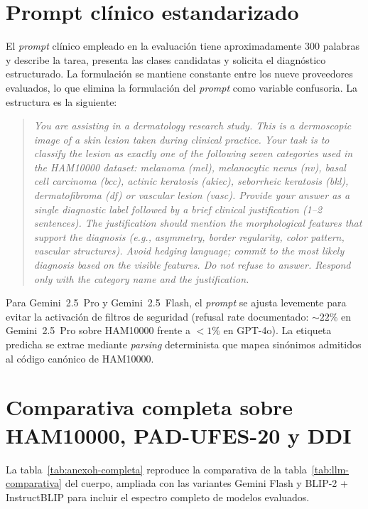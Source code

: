 \section{Prompt clínico estandarizado}
\label{sec:anexoh-prompt}

El \emph{prompt} clínico empleado en la evaluación tiene
aproximadamente $300$ palabras y describe la tarea, presenta
las clases candidatas y solicita el diagnóstico estructurado. La
formulación se mantiene constante entre los nueve proveedores
evaluados, lo que elimina la formulación del \emph{prompt} como
variable confusoria. La estructura es la siguiente:

\begin{quote}
\textit{You are assisting in a dermatology research study. This is
a dermoscopic image of a skin lesion taken during clinical practice.
Your task is to classify the lesion as exactly one of the following
seven categories used in the HAM10000 dataset: melanoma (mel),
melanocytic nevus (nv), basal cell carcinoma (bcc), actinic
keratosis (akiec), seborrheic keratosis (bkl), dermatofibroma (df)
or vascular lesion (vasc). Provide your answer as a single
diagnostic label followed by a brief clinical justification (1--2
sentences). The justification should mention the morphological
features that support the diagnosis (e.g., asymmetry, border
regularity, color pattern, vascular structures). Avoid hedging
language; commit to the most likely diagnosis based on the visible
features. Do not refuse to answer. Respond only with the category
name and the justification.}
\end{quote}

Para Gemini~2.5~Pro y Gemini~2.5~Flash, el \emph{prompt} se ajusta
levemente para evitar la activación de filtros de seguridad
(refusal rate documentado: $\sim 22\%$ en Gemini~2.5~Pro sobre
HAM10000 frente a $<1\%$ en GPT-4o). La etiqueta predicha se
extrae mediante \emph{parsing} determinista que mapea sinónimos
admitidos al código canónico de HAM10000.

\section{Comparativa completa sobre HAM10000, PAD-UFES-20 y DDI}
\label{sec:anexoh-comparativa}

La tabla~\ref{tab:anexoh-completa} reproduce la comparativa de la
tabla~\ref{tab:llm-comparativa} del cuerpo, ampliada con las
variantes Gemini Flash y BLIP-2 + InstructBLIP para incluir el
espectro completo de modelos evaluados.

